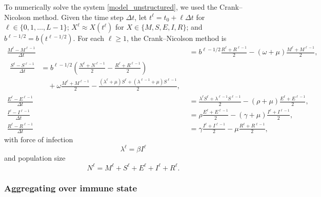 \documentclass{jpmarticle}
\let\subequationsorig\subequations%
\let\endsubequationsorig\endsubequations%
\renewenvironment{subequations}{
  \subequationsorig
  \renewcommand{\theequation}{\theparentequation.\arabic{equation}}
}{
  \endsubequationsorig
}
\begin{document}
\begin{subequations}
  To numerically solve the system \eqref{model_unstructured}, we used
  the Crank--Nicolson method. Given the time step $\Delta t$, let
  $t^{\ell} = t_0 + \ell \Delta t$ for $\ell \in \{0, 1, \ldots, L - 1\}$;
  $X^{\ell} \approx X(t^{\ell})$ for $X \in \{M, S, E, I, R\}$;
  and $b^{\ell - 1 / 2} = b(t^{\ell - 1 / 2})$.
  For each $\ell \geq 1$, the Crank--Nicolson method is
  \label{numerics_unstructured}
  \begin{align}
    \frac{M^{\ell} - M^{\ell - 1}}{\Delta t}
    &=
    b^{\ell - 1 / 2}
    \frac{R^{\ell} + R^{\ell - 1}}{2}
    - (\omega + \mu)
    \frac{M^{\ell} + M^{\ell - 1}}{2},
    \\
    \begin{split}
      \frac{S^{\ell} - S^{\ell - 1}}{\Delta t}
      &=
      b^{\ell - 1 / 2}
      \left(\frac{N^{\ell} + N^{\ell - 1}}{2}
        - \frac{R^{\ell} + R^{\ell - 1}}{2}\right)
      \\ & \quad {}
      + \omega \frac{M^{\ell} + M^{\ell - 1}}{2}
      - \frac{(\lambda^{\ell} + \mu) S^{\ell}
        + (\lambda^{\ell - 1} + \mu) S^{\ell - 1}}{2},
    \end{split}
    \\
    \frac{E^{\ell} - E^{\ell - 1}}{\Delta t}
    &=
    \frac{\lambda^{\ell} S^{\ell} + \lambda^{\ell - 1} S^{\ell- 1}}{2}
    - (\rho + \mu)
    \frac{E^{\ell} + E^{\ell - 1}}{2},
    \\
    \frac{I^{\ell} - I^{\ell - 1}}{\Delta t}
    &=
    \rho \frac{E^{\ell} + E^{\ell - 1}}{2}
    - (\gamma + \mu) \frac{I^{\ell} + I^{\ell - 1}}{2},
    \\
    \frac{R^{\ell} - R^{\ell - 1}}{\Delta t}
    &=
    \gamma \frac{I^{\ell} + I^{\ell - 1}}{2}
    - \mu \frac{R^{\ell} + R^{\ell - 1}}{2},
  \end{align}
  with force of infection
  \begin{equation}
    \lambda^{\ell} = \beta I^{\ell}
  \end{equation}
  and population size
  \begin{equation}
    N^{\ell} = M^{\ell} + S^{\ell} + E^{\ell} + I^{\ell} + R^{\ell}.
  \end{equation}
\end{subequations}


\subsubsection{Aggregating over immune state}
\end{document}
